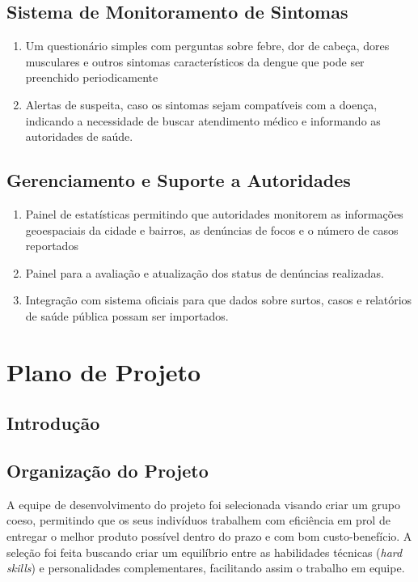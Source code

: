 \documentclass[a4paper, 12pt]{article}
\begin{document}
\subsection{Sistema de Monitoramento de Sintomas}
\begin{enumerate}
    \item Um questionário simples com perguntas sobre febre, dor de cabeça, dores musculares e outros sintomas característicos da dengue que pode ser preenchido periodicamente
    \item Alertas de suspeita, caso os sintomas sejam compatíveis com a doença, indicando a necessidade de buscar atendimento médico e informando as autoridades de saúde.
\end{enumerate}
\subsection{Gerenciamento e Suporte a Autoridades}
\begin{enumerate}
    \item Painel de estatísticas permitindo que autoridades monitorem as informações geoespaciais da cidade e bairros, as denúncias de focos e o número de casos  reportados
    \item Painel para a avaliação e atualização dos status de denúncias realizadas.
    \item Integração com sistema oficiais para que dados sobre surtos, casos e relatórios de saúde pública possam ser importados.
\end{enumerate}

\newpage
\section{Plano de Projeto}

\subsection{Introdução}

\subsection{Organização do Projeto}
A equipe de desenvolvimento do projeto foi selecionada visando criar um grupo coeso, permitindo que os seus indivíduos trabalhem com eficiência em prol de entregar o melhor produto possível dentro do prazo e com bom custo-benefício. A seleção foi feita buscando criar um equilíbrio entre as habilidades técnicas (\textit{hard skills}) e personalidades complementares, facilitando assim o trabalho em equipe.
\end{document}
